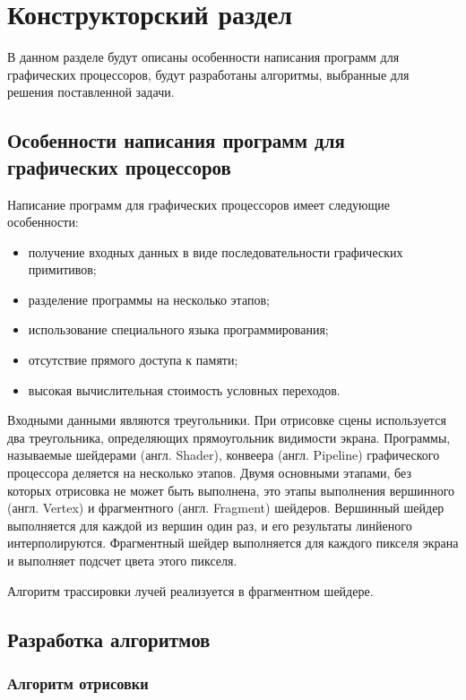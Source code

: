 \chapter{Конструкторский раздел}

В данном разделе будут описаны особенности написания программ для графических процессоров, 
будут разработаны алгоритмы, выбранные для решения поставленной задачи.

\section{Особенности написания программ для графических процессоров}

Написание программ для графических процессоров имеет следующие особенности:
\begin{itemize}
    \item получение входных данных в виде последовательности графических примитивов;
    \item разделение программы на несколько этапов;
    \item использование специального языка программирования;
    \item отсутствие прямого доступа к памяти;
    \item высокая вычислительная стоимость условных переходов.
\end{itemize}

Входными данными являются треугольники. При отрисовке сцены используется два треугольника,
определяющих прямоугольник видимости экрана.
Программы, называемые шейдерами (англ. Shader), конвеера (англ. Pipeline) 
графического процессора деляется на несколько этапов. Двумя основными этапами, 
без которых отрисовка не может быть выполнена, это этапы выполнения вершинного (англ. Vertex) и 
фрагментного (англ. Fragment) шейдеров. Вершинный шейдер выполняется для каждой из вершин один
раз, и его результаты линйеного интерполируются. Фрагментный шейдер
выполняется для каждого пикселя экрана и выполняет подсчет цвета этого пикселя.

Алгоритм трассировки лучей реализуется в фрагментном шейдере.

\section{Разработка алгоритмов}

\subsection{Алгоритм отрисовки}

